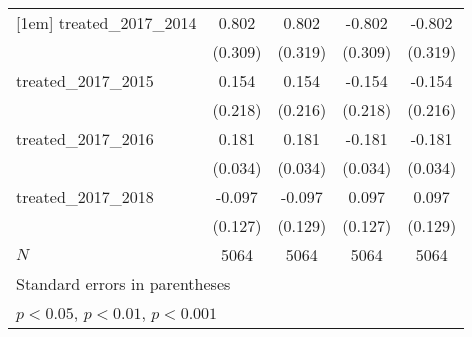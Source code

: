 {\begin{tabular}{l*{4}{c}}
[1em]
treated\_2017\_2014&       0.802\sym{**} &       0.802\sym{*}  &      -0.802\sym{**} &      -0.802\sym{*}  \\
            &     (0.309)         &     (0.319)         &     (0.309)         &     (0.319)         \\
[1em]
treated\_2017\_2015&       0.154         &       0.154         &      -0.154         &      -0.154         \\
            &     (0.218)         &     (0.216)         &     (0.218)         &     (0.216)         \\
[1em]
treated\_2017\_2016&       0.181\sym{***}&       0.181\sym{***}&      -0.181\sym{***}&      -0.181\sym{***}\\
            &     (0.034)         &     (0.034)         &     (0.034)         &     (0.034)         \\
[1em]
treated\_2017\_2018&      -0.097         &      -0.097         &       0.097         &       0.097         \\
            &     (0.127)         &     (0.129)         &     (0.127)         &     (0.129)         \\
\hline
\(N\)       &        5064         &        5064         &        5064         &        5064         \\
\hline\hline
\multicolumn{5}{l}{\footnotesize Standard errors in parentheses}\\
\multicolumn{5}{l}{\footnotesize \sym{*} \(p<0.05\), \sym{**} \(p<0.01\), \sym{***} \(p<0.001\)}\\
\end{tabular}
}
